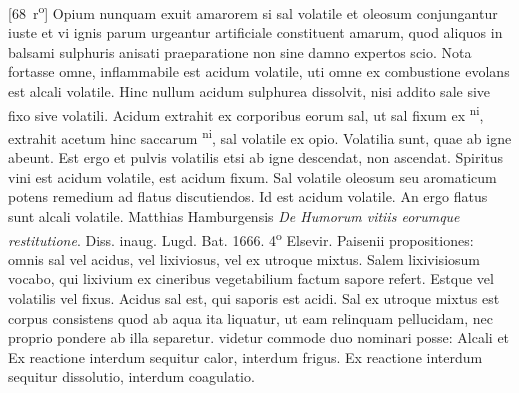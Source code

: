 [68~r\textsuperscript{o}]
\pend%
\pstart%
Opium nunquam exuit amarorem si sal volatile et oleosum conjungantur iuste et vi ignis parum urgeantur artificiale constituent amarum, quod aliquos in balsami sulphuris anisati praeparatione non sine damno expertos scio. Nota fortasse omne, inflammabile est acidum volatile, uti omne ex combustione evolans est alcali volatile.
\pend%
\pstart%
Hinc nullum acidum sulphurea dissolvit, nisi addito sale sive fixo sive volatili.
\pend%
\pstart%
Acidum extrahit ex corporibus eorum sal, ut sal fixum ex \saturn\textsuperscript{ni}, extrahit acetum hinc saccarum \saturn\textsuperscript{ni}, sal volatile ex opio.
\pend%
\pstart%
Volatilia sunt, quae ab igne abeunt. Est ergo et pulvis  volatilis etsi ab igne descendat, non ascendat.
\pend%
\pstart%
Spiritus vini est acidum volatile,  est acidum fixum.
\pend%
\pstart%
Sal volatile oleosum seu aromaticum potens remedium ad flatus discutiendos. Id est acidum volatile. An ergo flatus sunt alcali volatile.
\pend%
\pstart%
Matthias \protect{} Hamburgensis \textit{De Humorum vitiis eorumque restitutione}. Diss. inaug. Lugd. Bat.\protect{} 1666. 4\textsuperscript{o} Elsevir.
\pend%
\pstart%
Paisenii\protect{} propositiones: omnis sal vel acidus, vel lixiviosus, vel ex utroque mixtus. Salem lixivisiosum vocabo, qui lixivium ex cineribus vegetabilium factum sapore refert. Estque vel volatilis vel fixus. Acidus sal est, qui saporis est acidi. Sal ex utroque mixtus est corpus consistens quod ab aqua ita liquatur, ut eam relinquam pellucidam, nec proprio pondere ab illa
%
%
%
%
separetur.
\pend%
\pstart%
videtur commode duo
nominari
%
%
%
posse: Alcali et 
\pend%
\pstart%
Ex reactione interdum sequitur calor, interdum frigus. Ex reactione interdum sequitur dissolutio, interdum coagulatio.
